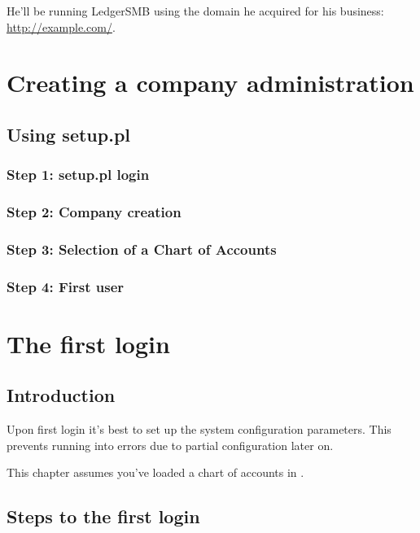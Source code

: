 He'll be running LedgerSMB using the domain he acquired for his business:
\url{http://example.com/}.

\chapter{Creating a company administration}
\label{cha:CompanyCreation}

\section{Using setup.pl}

\subsection{Step 1: setup.pl login}

\subsection{Step 2: Company creation}

\subsection{Step 3: Selection of a Chart of Accounts}

\subsection{Step 4: First user}

\chapter{The first login}

\section{Introduction}

Upon first login it's best to set up the system configuration parameters. This
prevents running into errors due to partial configuration later on.

This chapter assumes you've loaded a chart of accounts in .

\section{Steps to the first login}

